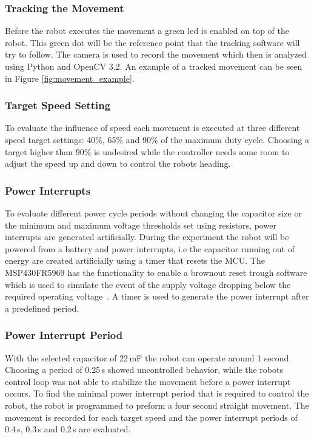 \subsubsection{Tracking the Movement}

Before the robot executes the movement a green led is enabled on top of the robot.
This green dot will be the reference point that the tracking software will try to follow.
The camera is used to record the movement which then is analyzed using Python and OpenCV 3.2.
An example of a tracked movement can be seen in Figure \ref{fig:movement_example}.

\subsubsection{Target Speed Setting}
To evaluate the influence of speed each movement is executed at three different speed target settings: 40\%, 65\% and 90\% of the maximum duty cycle.
Choosing a target higher than 90\% is undesired while the controller needs some room to adjust the speed up and down to control the robots heading.

\subsubsection{Power Interrupts}

To evaluate different power cycle periods without changing the capacitor size or the minimum and maximum voltage thresholds set using resistors, power interrupts are generated artificially.
During the experiment the robot will be powered from a battery and power interrupts, i.e the capacitor running out of energy are created artificially using a timer that resets the MCU.
The MSP430FR5969 has the functionality to enable a brownout reset trough software which is used to simulate the event of the supply voltage dropping below the required operating voltage~\cite{msp430fr_family_guide_2017}.
A timer is used to generate the power interrupt after a predefined period.

\subsubsection{Power Interrupt Period}

With the selected capacitor of 22\,mF the robot can operate around 1 second. 
Choosing a period of 0.25\,s showed uncontrolled behavior, while the robots control loop was not able to stabilize the movement before a power interrupt occurs.
To find the minimal power interrupt period that is required to control the robot, the robot is programmed to preform a four second straight movement.
The movement is recorded for each target speed and the power interrupt periods of 0.4\,s, 0.3\,s and 0.2\,s are evaluated.

